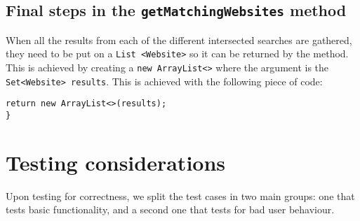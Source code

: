 \subsection{Final steps in the {\tt getMatchingWebsites} method}
When all the results from each of the different intersected searches are gathered, they need to be put on a {\tt List <Website>} so it can be returned by the method. This is achieved by creating a {\tt new ArrayList<>} where the argument is the {\tt Set<Website> results}. This is achieved with the following piece of code:
\begin{lstlisting}
return new ArrayList<>(results);
}
\end{lstlisting}

\section{Testing considerations} %
Upon testing for correctness, we split the test cases in two main groups: one that tests basic functionality, and a second one that tests for bad user behaviour.
